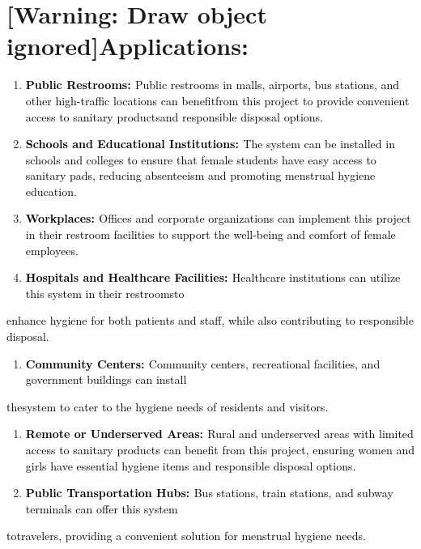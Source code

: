\documentclass[letterpaper]{article}
\newcounter{saveenum}
\newcommand\liststyleWWNumiii{%
\renewcommand\theenumi{\arabic{enumi}}
\renewcommand\labelenumi{\theenumi.}
\renewcommand\labelitemi{{\textbullet}}
\renewcommand\labelitemii{{\textbullet}}
\renewcommand\labelitemiii{{\textbullet}}
}
\begin{document}
\section[Applications:]{[Warning: Draw object ignored]Applications:}

\bigskip

\liststyleWWNumiii
\begin{enumerate}
\item \textbf{\textcolor{black}{Public Restrooms: }}\textcolor{black}{Public restrooms in malls, airports, bus stations,
and other high-traffic locations can benefitfrom this project to provide convenient access to sanitary productsand
responsible disposal options.}
\item \textbf{\textcolor{black}{Schools and Educational Institutions: }}\textcolor{black}{The system can be installed in
schools and colleges to ensure that female students have easy access to sanitary pads, reducing absenteeism and
promoting menstrual hygiene education.}
\item \textbf{\textcolor{black}{Workplaces: }}\textcolor{black}{Offices and corporate organizations can implement this
project in their restroom facilities to support the well-being and comfort of female employees.}
\item \textbf{\textcolor{black}{Hospitals and Healthcare Facilities: }}\textcolor{black}{Healthcare institutions can
utilize this system in their restroomsto}
\end{enumerate}

\bigskip

\textcolor{black}{enhance hygiene for both patients and staff, while also contributing to responsible disposal.}

\liststyleWWNumiii
\setcounter{saveenum}{\value{enumi}}
\begin{enumerate}
\setcounter{enumi}{\value{saveenum}}
\item \textbf{\textcolor{black}{Community Centers: }}\textcolor{black}{Community centers, recreational facilities, and
government buildings can install}
\end{enumerate}
\textcolor{black}{thesystem to cater to the hygiene needs of residents and visitors.}

\liststyleWWNumiii
\setcounter{saveenum}{\value{enumi}}
\begin{enumerate}
\setcounter{enumi}{\value{saveenum}}
\item \textbf{\textcolor{black}{Remote or Underserved Areas: }}\textcolor{black}{Rural and underserved areas with
limited access to sanitary products can benefit from this project, ensuring women and girls have essential hygiene
items and responsible disposal options.}
\item \textbf{\textcolor{black}{Public Transportation Hubs: }}\textcolor{black}{Bus stations, train stations, and subway
terminals can offer this system}
\end{enumerate}
\textcolor{black}{totravelers, providing a convenient solution for menstrual hygiene needs.}
\end{document}
